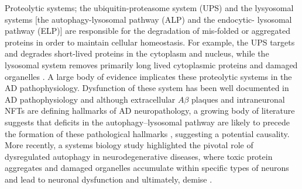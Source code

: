Proteolytic systems; the ubiquitin-proteasome system (UPS) and the lysyosomal systems [the autophagy-lysosomal pathway (ALP) and the endocytic- lysosomal pathway (ELP)] are responsible for the degradation of mis-folded or aggregated proteins in order to maintain cellular homeostasis. For example, the UPS targets and degrades short-lived proteins in the cytoplasm and nucleus, while the lysosomal system removes primarily long lived cytoplasmic proteins and damaged organelles \citep{Ravikumar2003,Rubinsztein2005}. A large body of evidence implicates these proteolytic systems in the AD pathophysiology. Dysfunction of these system has been well documented in AD pathophysiology and although extracellular $A\beta$ plaques and intraneuronal NFTs are defining hallmarks of AD neuropathology, a growing body of literature suggests that deficits in the autophagy–lysosomal pathway are likely to precede the formation of these pathological hallmarks \citep{Cataldo2000,Nixon2011,Perez2015,zare-shahabadi2015}, suggesting a potential causality. More recently, a systems biology study highlighted the pivotal role of dysregulated autophagy in neurodegenerative diseases, where toxic protein aggregates and damaged organelles accumulate within specific types of neurons and lead to neuronal dysfunction and ultimately, demise \citep{Caberlotto2014}.

